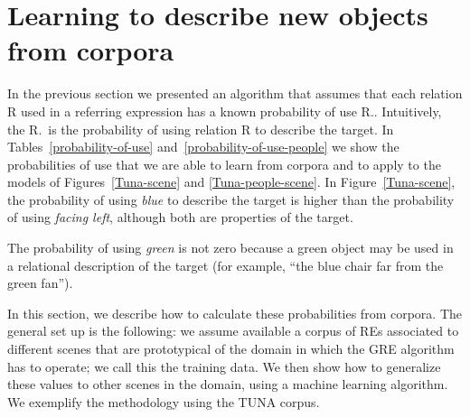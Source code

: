 \section{Learning to describe new objects from corpora}
\label{sec:learning}

In the previous section we presented an algorithm that assumes that each relation R 
used in a referring expression has a known probability of use R.\puse. 
Intuitively, the R.\puse~is the probability of using relation R to describe the target. In Tables~\ref{probability-of-use} and~\ref{probability-of-use-people} we show the probabilities of use that we are able to learn from corpora and to apply to the models of Figures~\ref{Tuna-scene} and \ref{Tuna-people-scene}.  In Figure~\ref{Tuna-scene}, the probability of using \emph{blue} to describe the target is higher than the probability of using \emph{facing left}, although both are properties of the target.

The probability of using \emph{green} is not zero because a green object may be used in a relational description of the target (for example, ``the blue chair far from the green fan''). 

In this section, we describe how to calculate these probabilities from corpora.  
The general set up is the following: we assume available a corpus of REs associated 
to different scenes that are prototypical of the domain in which the GRE algorithm has to operate; we call this the training data.   
We then show how to generalize these values to other scenes in the domain, using a machine learning algorithm. We exemplify the methodology using the TUNA corpus. 


